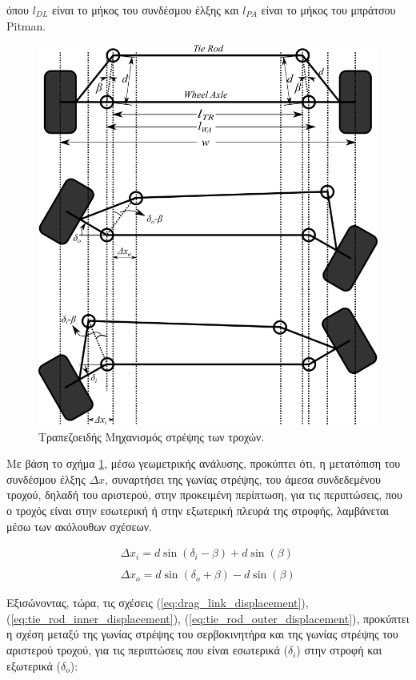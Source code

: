 \bigskip\noindent
όπου $l_{DL}$ είναι το μήκος του {συνδέσμου έλξης} και $l_{PA}$ είναι το μήκος του {μπράτσου Pitman}.

\begin{figure}[!ht]
	\centering
	\includegraphics[width=0.8\linewidth]{Chapters/Chapter2/Figures/trapezoid_steering_mechanism.png}
	\caption{Τραπεζοειδής Μηχανισμός στρέψης των τροχών.}
	\label{fig:trapezoid_steering_mechanism}
\end{figure}

\bigskip
Με βάση το σχήμα \ref{fig:trapezoid_steering_mechanism}, μέσω γεωμετρικής ανάλυσης, προκύπτει ότι, η μετατόπιση του {συνδέσμου έλξης} $\Delta x$, συναρτήσει της γωνίας στρέψης, του άμεσα συνδεδεμένου τροχού, δηλαδή του αριστερού, στην προκειμένη περίπτωση, για τις περιπτώσεις, που ο τροχός είναι στην εσωτερική ή στην εξωτερική  πλευρά της στροφής, λαμβάνεται μέσω των ακόλουθων σχέσεων.
 
\begin{align}
	\label{eq:tie_rod_inner_displacement}
	\Delta x_i = d \sin(\delta_i - \beta) + d \sin(\beta)\\
	\label{eq:tie_rod_outer_displacement}\\
	\Delta x_o = d \sin(\delta_o + \beta) - d \sin(\beta)
\end{align}

\bigskip
Εξισώνοντας, τώρα, τις σχέσεις (\ref{eq:drag_link_displacement}), (\ref{eq:tie_rod_inner_displacement}), (\ref{eq:tie_rod_outer_displacement}), προκύπτει η σχέση μεταξύ της γωνίας στρέψης του σερβοκινητήρα και της γωνίας στρέψης του αριστερού τροχού, για τις περιπτώσεις που είναι εσωτερικά ($\delta_i$) στην στροφή και εξωτερικά ($\delta_o$):

